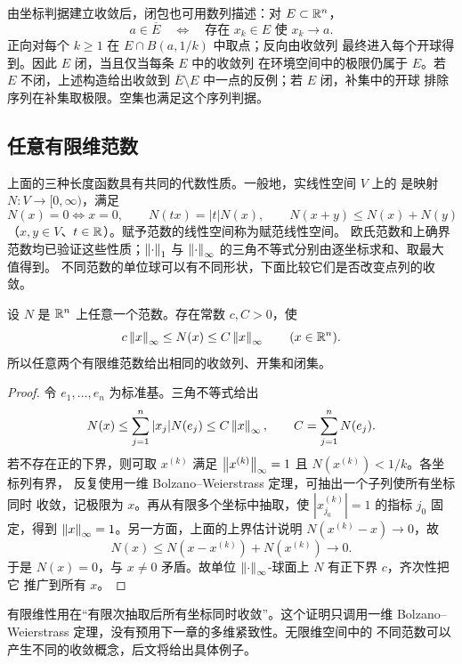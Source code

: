 由坐标判据建立收敛后，闭包也可用数列描述：对 \(E\subset\mathbb{R}^n\)，
\[
 a\in\overline E\quad\Longleftrightarrow\quad
 \text{存在 }x_k\in E\text{ 使 }x_k\to a.
\]
正向对每个 \(k\ge1\) 在 \(E\cap B(a,1/k)\) 中取点；反向由收敛列
最终进入每个开球得到。因此 \(E\) 闭，当且仅当每条 \(E\) 中的收敛列
在环境空间中的极限仍属于 \(E\)。若 \(E\) 不闭，上述构造给出收敛到
\(\overline E\setminus E\) 中一点的反例；若 \(E\) 闭，补集中的开球
排除序列在补集取极限。空集也满足这个序列判据。

\subsection{任意有限维范数}

上面的三种长度函数具有共同的代数性质。一般地，实线性空间 \(V\) 上的
是映射 \(N:V\to[0,\infty)\)，满足
\[
 N(x)=0\Longleftrightarrow x=0,\qquad
 N(tx)=|t|N(x),\qquad N(x+y)\le N(x)+N(y)
\]
（\(x,y\in V\)、\(t\in\mathbb{R}\)）。赋予范数的线性空间称为赋范线性空间。
欧氏范数和上确界范数均已验证这些性质；\(\left\lVert\cdot\right\rVert_1\) 与
\(\left\lVert\cdot\right\rVert_\infty\) 的三角不等式分别由逐坐标求和、取最大值得到。
不同范数的单位球可以有不同形状，下面比较它们是否改变点列的收敛。

\begin{theorem}[有限维范数等价]
\label{thm:finite-dimensional-norm-equivalence}
设 \(N\) 是 \(\mathbb{R}^n\) 上任意一个范数。存在常数 \(c,C>0\)，使
\[
 c\left\lVert x\right\rVert_\infty\le N(x)\le C\left\lVert x\right\rVert_\infty
 \qquad(x\in\mathbb{R}^n).
\]
所以任意两个有限维范数给出相同的收敛列、开集和闭集。
\end{theorem}

\begin{proof}
令 \(e_1,\ldots,e_n\) 为标准基。三角不等式给出
\[
 N(x)\le\sum_{j=1}^n|x_j|N(e_j)
 \le C\left\lVert x\right\rVert_\infty,
 \qquad C=\sum_{j=1}^nN(e_j).
\]
若不存在正的下界，则可取 \(x^{(k)}\) 满足
\(\left\lVert x^{(k)}\right\rVert_\infty=1\) 且 \(N(x^{(k)})<1/k\)。各坐标列有界，
反复使用一维 Bolzano--Weierstrass 定理，可抽出一个子列使所有坐标同时
收敛，记极限为 \(x\)。再从有限多个坐标中抽取，使
\(|x^{(k)}_{j_0}|=1\) 的指标 \(j_0\) 固定，得到
\(\left\lVert x\right\rVert_\infty=1\)。另一方面，上面的上界估计说明
\(N(x^{(k)}-x)\to0\)，故
\[
 N(x)\le N(x-x^{(k)})+N(x^{(k)})\longrightarrow0.
\]
于是 \(N(x)=0\)，与 \(x\ne0\) 矛盾。故单位
\(\left\lVert\cdot\right\rVert_\infty\)-球面上 \(N\) 有正下界 \(c\)，齐次性把它
推广到所有 \(x\)。
\end{proof}

有限维性用在“有限次抽取后所有坐标同时收敛”。这个证明只调用一维
Bolzano--Weierstrass 定理，没有预用下一章的多维紧致性。无限维空间中的
不同范数可以产生不同的收敛概念，后文将给出具体例子。

